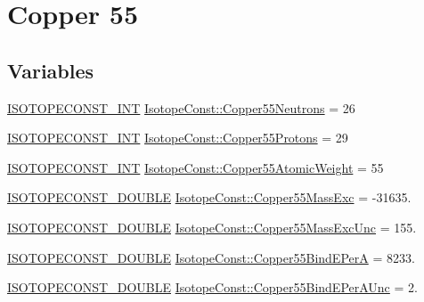 \hypertarget{group___isotope_const-_copper-_cu55}{}\section{Copper 55}
\label{group___isotope_const-_copper-_cu55}
\subsection*{Variables}
\begin{DoxyCompactItemize}
\item 
\mbox{\hyperlink{group___isotope_const-_macros_ga5f18360b3e99483a35c32d789e62621c}{I\+S\+O\+T\+O\+P\+E\+C\+O\+N\+S\+T\+\_\+\+I\+NT}} \mbox{\hyperlink{group___isotope_const-_copper-_cu55_ga3ab22a691d1296513d7965a909a4c2dd}{Isotope\+Const\+::\+Copper55\+Neutrons}} = 26
\item 
\mbox{\hyperlink{group___isotope_const-_macros_ga5f18360b3e99483a35c32d789e62621c}{I\+S\+O\+T\+O\+P\+E\+C\+O\+N\+S\+T\+\_\+\+I\+NT}} \mbox{\hyperlink{group___isotope_const-_copper-_cu55_gaf8636d25b1036aa24074c5d4968c0e28}{Isotope\+Const\+::\+Copper55\+Protons}} = 29
\item 
\mbox{\hyperlink{group___isotope_const-_macros_ga5f18360b3e99483a35c32d789e62621c}{I\+S\+O\+T\+O\+P\+E\+C\+O\+N\+S\+T\+\_\+\+I\+NT}} \mbox{\hyperlink{group___isotope_const-_copper-_cu55_gac4f002aaac8d2fd43dc48d1a3c6af646}{Isotope\+Const\+::\+Copper55\+Atomic\+Weight}} = 55
\item 
\mbox{\hyperlink{group___isotope_const-_macros_ga8f45a7272ce02c0b4c65c44636ed719a}{I\+S\+O\+T\+O\+P\+E\+C\+O\+N\+S\+T\+\_\+\+D\+O\+U\+B\+LE}} \mbox{\hyperlink{group___isotope_const-_copper-_cu55_gab08c42982edd3795cf26c14d7d4d62f2}{Isotope\+Const\+::\+Copper55\+Mass\+Exc}} = -\/31635.
\item 
\mbox{\hyperlink{group___isotope_const-_macros_ga8f45a7272ce02c0b4c65c44636ed719a}{I\+S\+O\+T\+O\+P\+E\+C\+O\+N\+S\+T\+\_\+\+D\+O\+U\+B\+LE}} \mbox{\hyperlink{group___isotope_const-_copper-_cu55_ga394c4f881c821b24e146a426d59bb115}{Isotope\+Const\+::\+Copper55\+Mass\+Exc\+Unc}} = 155.
\item 
\mbox{\hyperlink{group___isotope_const-_macros_ga8f45a7272ce02c0b4c65c44636ed719a}{I\+S\+O\+T\+O\+P\+E\+C\+O\+N\+S\+T\+\_\+\+D\+O\+U\+B\+LE}} \mbox{\hyperlink{group___isotope_const-_copper-_cu55_gae18fc2ea00b77e26dabc8d7c0d32bf03}{Isotope\+Const\+::\+Copper55\+Bind\+E\+PerA}} = 8233.
\item 
\mbox{\hyperlink{group___isotope_const-_macros_ga8f45a7272ce02c0b4c65c44636ed719a}{I\+S\+O\+T\+O\+P\+E\+C\+O\+N\+S\+T\+\_\+\+D\+O\+U\+B\+LE}} \mbox{\hyperlink{group___isotope_const-_copper-_cu55_ga8e74a3dd561e4e019c37e417056451e1}{Isotope\+Const\+::\+Copper55\+Bind\+E\+Per\+A\+Unc}} = 2.

\end{DoxyCompactItemize}
